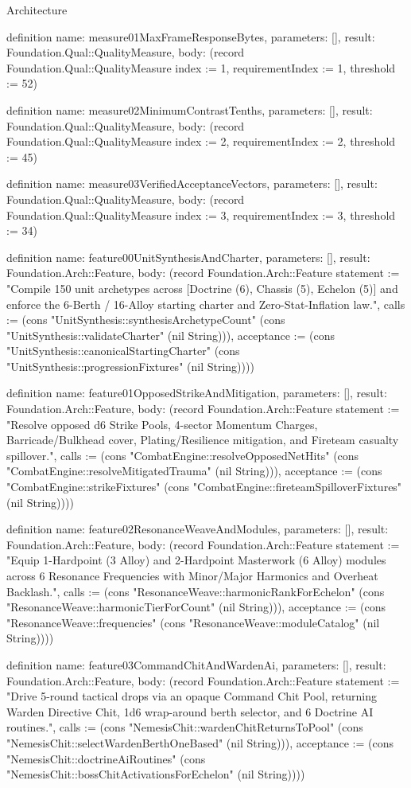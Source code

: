 \begin{lexlean}{Architecture}
\begin{semanticmodule}
definition{
  name: measure01MaxFrameResponseBytes,
  parameters: [],
  result: Foundation.Qual::QualityMeasure,
  body: (record Foundation.Qual::QualityMeasure {index := 1, requirementIndex := 1, threshold := 52})
}

definition{
  name: measure02MinimumContrastTenths,
  parameters: [],
  result: Foundation.Qual::QualityMeasure,
  body: (record Foundation.Qual::QualityMeasure {index := 2, requirementIndex := 2, threshold := 45})
}

definition{
  name: measure03VerifiedAcceptanceVectors,
  parameters: [],
  result: Foundation.Qual::QualityMeasure,
  body: (record Foundation.Qual::QualityMeasure {index := 3, requirementIndex := 3, threshold := 34})
}

definition{
  name: feature00UnitSynthesisAndCharter,
  parameters: [],
  result: Foundation.Arch::Feature,
  body: (record Foundation.Arch::Feature {statement := "Compile 150 unit archetypes across [Doctrine (6), Chassis (5), Echelon (5)] and enforce the 6-Berth / 16-Alloy starting charter and Zero-Stat-Inflation law.", calls := (cons "UnitSynthesis::synthesisArchetypeCount" (cons "UnitSynthesis::validateCharter" (nil String))), acceptance := (cons "UnitSynthesis::canonicalStartingCharter" (cons "UnitSynthesis::progressionFixtures" (nil String)))})
}

definition{
  name: feature01OpposedStrikeAndMitigation,
  parameters: [],
  result: Foundation.Arch::Feature,
  body: (record Foundation.Arch::Feature {statement := "Resolve opposed d6 Strike Pools, 4-sector Momentum Charges, Barricade/Bulkhead cover, Plating/Resilience mitigation, and Fireteam casualty spillover.", calls := (cons "CombatEngine::resolveOpposedNetHits" (cons "CombatEngine::resolveMitigatedTrauma" (nil String))), acceptance := (cons "CombatEngine::strikeFixtures" (cons "CombatEngine::fireteamSpilloverFixtures" (nil String)))})
}

definition{
  name: feature02ResonanceWeaveAndModules,
  parameters: [],
  result: Foundation.Arch::Feature,
  body: (record Foundation.Arch::Feature {statement := "Equip 1-Hardpoint (3 Alloy) and 2-Hardpoint Masterwork (6 Alloy) modules across 6 Resonance Frequencies with Minor/Major Harmonics and Overheat Backlash.", calls := (cons "ResonanceWeave::harmonicRankForEchelon" (cons "ResonanceWeave::harmonicTierForCount" (nil String))), acceptance := (cons "ResonanceWeave::frequencies" (cons "ResonanceWeave::moduleCatalog" (nil String)))})
}

definition{
  name: feature03CommandChitAndWardenAi,
  parameters: [],
  result: Foundation.Arch::Feature,
  body: (record Foundation.Arch::Feature {statement := "Drive 5-round tactical drops via an opaque Command Chit Pool, returning Warden Directive Chit, 1d6 wrap-around berth selector, and 6 Doctrine AI routines.", calls := (cons "NemesisChit::wardenChitReturnsToPool" (cons "NemesisChit::selectWardenBerthOneBased" (nil String))), acceptance := (cons "NemesisChit::doctrineAiRoutines" (cons "NemesisChit::bossChitActivationsForEchelon" (nil String)))})
}


\end{semanticmodule}
\end{lexlean}
